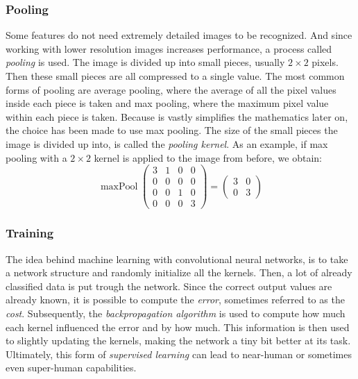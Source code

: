 \documentclass[12pt, titlepage]{article}
\begin{document}
		\subsubsection{Pooling}\label{pooling}
		Some features do not need extremely detailed images to be recognized. And since working with lower resolution images increases performance, a process called \textit{pooling} is used. The image is divided up into small pieces, usually $2\times 2$ pixels. Then these small pieces are all compressed to a single value. The most common forms of pooling are average pooling, where the average of all the pixel values inside each piece is taken and max pooling, where the maximum pixel value within each piece is taken. Because is vastly simplifies the mathematics later on, the choice has been made to use max pooling. The size of the small pieces the image is divided up into, is called the \textit{pooling kernel}. As an example, if max pooling with a $2\times 2$ kernel is applied to the image from before, we obtain:
		\begin{equation*}
		\operatorname{maxPool}\begin{pmatrix}
		3 &1 &0 &0\\
		0 & 0 & 0 &0\\
		0 &0 &1 &0\\
		0 &0 &0 &3
		\end{pmatrix} = \begin{pmatrix}
		3 &0\\
		0 &3
		\end{pmatrix}
		\end{equation*}
		
		
		\subsubsection{Training}
		The idea behind machine learning with convolutional neural networks, is to take a network structure and randomly initialize all the kernels. Then, a lot of already classified data is put trough the network. Since the correct output values are already known, it is possible to compute the \textit{error}, sometimes referred to as the \textit{cost}. Subsequently, the \textit{backpropagation algorithm} is used to compute how much each kernel influenced the error and by how much. This information is then used to slightly updating the kernels, making the network a tiny bit better at its task. Ultimately, this form of \textit{supervised learning} can lead to near-human or sometimes even super-human capabilities.
		
\end{document}
